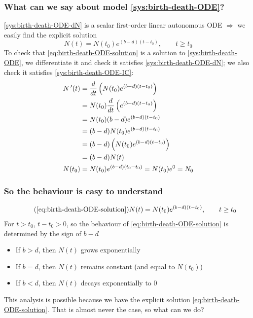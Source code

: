 \documentclass[aspectratio=169]{beamer}
\begin{document}
\begin{frame}\frametitle{What can we say about model \eqref{sys:birth-death-ODE}?}
\eqref{sys:birth-death-ODE-dN} is a scalar first-order linear autonomous ODE
$\Rightarrow$
we easily find the explicit solution
\begin{equation}
\label{eq:birth-death-ODE-solution}
N(t)=N(t_0)e^{(b-d)(t-t_0)},\qquad t\geq t_0
\end{equation}
\vfill
To check that \eqref{eq:birth-death-ODE-solution} is a solution to \eqref{sys:birth-death-ODE}, we differentiate it and check it satisfies \eqref{sys:birth-death-ODE-dN}; we also check it satisfies \eqref{sys:birth-death-ODE-IC}:
\begin{align*}
N\,'(t) &= \frac{d}{dt}\left(N(t_0)e^{(b-d)(t-t_0)}\right) \\
&= N(t_0) \frac{d}{dt}\left(e^{(b-d)(t-t_0)}\right) \\
&= N(t_0)(b-d)e^{(b-d)(t-t_0)} \\
&= (b-d)N(t_0)e^{(b-d)(t-t_0)} \\
&= (b-d)\left(N(t_0)e^{(b-d)(t-t_0)}\right) \\
&= (b-d)N(t) \\
N(t_0) &= N(t_0)e^{(b-d)(t_0-t_0)} = N(t_0)e^0 = N_0
\end{align*}
\end{frame}

\begin{frame}\frametitle{So the behaviour is easy to understand}
\begin{equation}
\tag{\ref{eq:birth-death-ODE-solution}}
N(t)=N(t_0)e^{(b-d)(t-t_0)},\qquad t\geq t_0
\end{equation}
\vfill
For $t>t_0$, $t-t_0>0$, so the behaviour of \eqref{eq:birth-death-ODE-solution} is determined by the sign of $b-d$
\vfill
\begin{itemize}
\item If $b>d$, then $N(t)$ grows exponentially
\item If $b=d$, then $N(t)$ remains constant (and equal to $N(t_0)$)
\item If $b<d$, then $N(t)$ decays exponentially to 0
\end{itemize}
\vfill
This analysis is possible because we have the explicit solution \eqref{eq:birth-death-ODE-solution}. That is almost never the case, so what can we do?
\end{frame}
\end{document}
